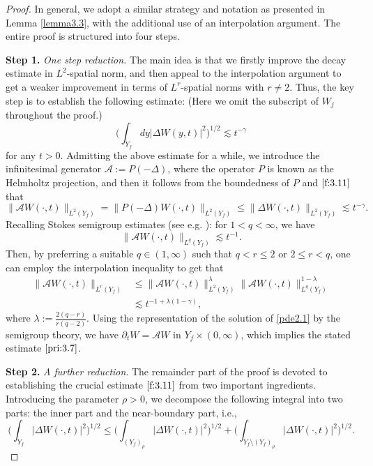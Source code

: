 \documentclass[13pt,CJK]{article}
\theoremstyle{plain}                       %
\theoremstyle{remark}
\numberwithin{equation}{section}
\begin{document}
\begin{proof}
In general, we adopt a similar strategy and notation as presented in Lemma \ref{lemma3.3}, with the additional use of an interpolation argument. The entire proof is structured into four steps.

\textbf{Step 1.} \emph{One step reduction.}
The main idea is that we firstly improve the decay estimate in
$L^2$-spatial norm, and then appeal to the interpolation argument
to get a weaker improvement in terms of $L^r$-spatial norms with $r\not= 2$. Thus,
the key step is to establish the following estimate: (Here we omit the subscript of $W_j$ throughout the proof.)
\begin{equation}\label{f:3.11}
\bigg(\int_{Y_f}dy|\Delta W(y,t)|^2\bigg)^{1/2}\lesssim
t^{-\gamma}
\end{equation}
for any $t>0$. Admitting the above estimate for a while, we introduce
the infinitesimal generator $\mathcal{A}:=P(-\Delta)$, where the operator $P$ is known as the Helmholtz projection, and then it follows from the boundedness of $P$ and $\eqref{f:3.11}$ that
\begin{equation*}
\|\mathcal{A}W(\cdot,t)\|_{L^2(Y_f)}=
\|P(-\Delta)W(\cdot,t)\|_{L^2(Y_f)}\leq
\|\Delta W(\cdot,t)\|_{L^2(Y_f)}\lesssim
t^{-\gamma}.
\end{equation*}
Recalling Stokes semigroup estimates (see e.g. \cite[pp.81]{Tsai18}):
for $1<q<\infty$, we have
\begin{equation*}
\|\mathcal{A} W(\cdot,t)\|_{L^q(Y_f)}\lesssim t^{-1}.
\end{equation*}
Then, by preferring a suitable $q\in(1,\infty)$ such that
$q<r\leq 2$ or $2\leq r<q$, one can employ the interpolation inequality to get that
\begin{equation*}
\begin{aligned}
\|\mathcal{A}W(\cdot,t)\|_{L^r(Y_f)}&\leq
\|\mathcal{A}W(\cdot,t)\|^{\lambda}_{L^2(Y_f)}
\|\mathcal{A}W(\cdot,t)\|^{1-\lambda}_{L^q(Y_f)}\\
&\lesssim t^{-1+\lambda(1-\gamma)},
\end{aligned}
\end{equation*}
where $\lambda:=\frac{2(q-r)}{r(q-2)}$. Using the
representation of the solution of \eqref{pde2.1} by the semigroup theory, we have $\partial_t W = \mathcal{A} W$ in
$Y_f\times (0,\infty)$, which implies
the stated estimate $\eqref{pri:3.7}$.


\textbf{Step 2.} \emph{A further reduction}.
The remainder part of the proof is devoted to establishing
the crucial estimate $\eqref{f:3.11}$ from two important ingredients.  Introducing the parameter $\rho>0$, we decompose the following integral into two parts: the inner part and the near-boundary part, i.e.,
\begin{equation}\label{pde2.24}
\bigg(
\int_{Y_f}|\Delta W(\cdot,t)|^2
\bigg)^{1/2}\leq
\bigg(
\int_{(Y_f)_{\rho}}|\Delta W(\cdot,t)|^2
\bigg)^{1/2}+
\bigg(
\int_{Y_f\setminus(Y_f)_{\rho}}|\Delta W(\cdot,t)|^2
\bigg)^{1/2}.
\end{equation}


\end{proof}
\end{document}
